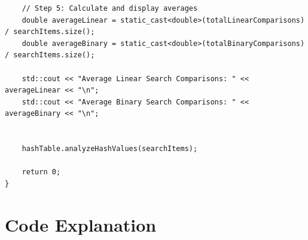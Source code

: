 \documentclass{article}
\begin{document}
\begin{lstlisting}
    // Step 5: Calculate and display averages
    double averageLinear = static_cast<double>(totalLinearComparisons) / searchItems.size();
    double averageBinary = static_cast<double>(totalBinaryComparisons) / searchItems.size();
    
    std::cout << "Average Linear Search Comparisons: " << averageLinear << "\n";
    std::cout << "Average Binary Search Comparisons: " << averageBinary << "\n";


    hashTable.analyzeHashValues(searchItems);

    return 0;
}
\end{lstlisting}


\section{Code Explanation}
\end{document}

